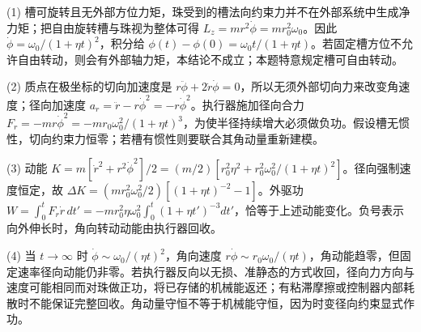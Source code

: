(1) 槽可旋转且无外部方位力矩，珠受到的槽法向约束力并不在外部系统中生成净力矩；把自由旋转槽与珠视为整体可得 \(L_z=mr^2\dot\phi=mr_0^2\omega_0\)。因此 \(\dot\phi=\omega_0/(1+\eta t)^2\)，积分给 \(\phi(t)-\phi(0)=\omega_0 t/(1+\eta t)\)。若固定槽方位不允许自由转动，则会有外部轴力矩，本结论不成立；本题特意规定槽可自由转动。

(2) 质点在极坐标的切向加速度是 \(r\ddot\phi+2\dot r\dot\phi=0\)，所以无须外部切向力来改变角速度；径向加速度 \(a_r=\ddot r-r\dot\phi^2=-r\dot\phi^2\)。执行器施加径向合力 \(F_r=-mr\dot\phi^2=-mr_0\omega_0^2/(1+\eta t)^3\)，为使半径持续增大必须做负功。假设槽无惯性，切向约束力恒零；若槽有惯性则要联合其角动量重新建模。

(3) 动能 \(K=m[\dot r^2+r^2\dot\phi^2]/2=(m/2)[r_0^2\eta^2+r_0^2\omega_0^2/(1+\eta t)^2]\)。径向强制速度恒定，故 \(\Delta K=(mr_0^2\omega_0^2/2)[(1+\eta t)^{-2}-1]\)。外驱功 \(W=\int_0^tF_r\dot r\,dt'=-mr_0^2\eta\omega_0^2\int_0^t(1+\eta t')^{-3}dt'\)，恰等于上述动能变化。负号表示向外伸长时，角向转动动能由执行器回收。

(4) 当 \(t\to\infty\) 时 \(\dot\phi\sim\omega_0/(\eta t)^2\)，角向速度 \(r\dot\phi\sim r_0\omega_0/(\eta t)\)，角动能趋零，但固定速率径向动能仍非零。若执行器反向以无损、准静态的方式收回，径向力方向与速度可能相同而对珠做正功，将已存储的机械能返还；有粘滞摩擦或控制器内部耗散时不能保证完整回收。角动量守恒不等于机械能守恒，因为时变径向约束显式作功。
